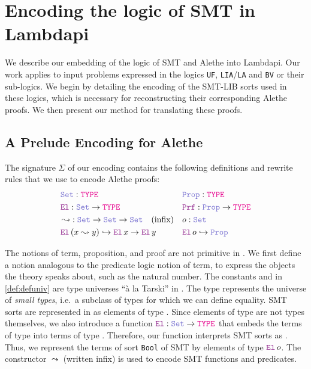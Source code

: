 
\chapter{Encoding the logic of SMT in Lambdapi} \label{ch:encoding}

We describe our embedding of the logic of SMT and Alethe into Lambdapi.
Our work applies to input problems expressed in the logics \texttt{UF}, \texttt{LIA}/\texttt{LA} and \texttt{BV} or their sub-logics.
We begin by detailing the encoding of the SMT-LIB sorts used in these logics, which is necessary for reconstructing their corresponding Alethe proofs.
We then present our method for translating these proofs.

\section{A Prelude Encoding for Alethe}
\label{sec:encoding-prelude}

\begin{definition}
\label{def:defuniv}
The signature $\Sigma$ of our encoding contains the following definitions and rewrite rules that we use to encode Alethe proofs:
\begin{align*}
&\set\index{\set}: \type & &\prop\index{\prop}: \type \\
&\index{\el{}} \el{}: \set \rightarrow \type  & &\index{\prf}\prf{} : \prop \rightarrow \type \\
&\mathop{\leadsto}\index{$\leadsto$}: \set \rightarrow \set \rightarrow \set \quad \text{(infix)} & &o: \set \\
&\el\,(x \leadsto y) \hookrightarrow \el\,x \rightarrow \el\,y & &\el\,o\index{o}  \hookrightarrow \prop
\end{align*}
\end{definition}

The notions of term, proposition, and proof are not primitive in \lpm.
We ﬁrst deﬁne a notion analogous to the predicate logic notion of term, to express the objects the theory speaks about, such as the natural number.
The constants \set{} and \prop{} in \cref{def:defuniv} are type universes ``à la Tarski'' \cite[\S Universes]{intuitype} in \lpm.
The type \set{} represents the universe of \textit{small types}, i.e.\ a subclass of types for which we can define equality.
SMT sorts are represented in \lpm{} as elements of type \set{}. Since elements of type \set{} are not types themselves, 
we also introduce a function $\el: \set \rightarrow \type$ that embeds the terms of type \set{} into terms of type \type.
Therefore, our function \el{} interprets SMT sorts as \type.
Thus, we represent the terms of sort \lstinline[language=SMT,basicstyle=\ttfamily\normalsize]|Bool| of SMT by elements of type $\el{}\,o$.
The constructor $\leadsto$ (written infix) is used to encode SMT functions and predicates.


